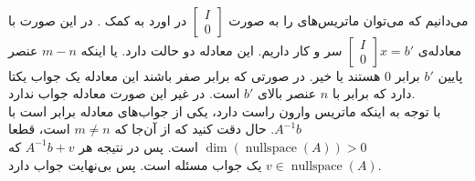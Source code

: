 \\
می‌دانیم که می‌توان ماتریس‌های
را به صورت
$\begin{bmatrix}
    I \\ 0
\end{bmatrix}$
در اورد به کمک
.
در این صورت با معادله‌ی
$\begin{bmatrix}
    I \\ 0
\end{bmatrix} x = b'$
سر و کار داریم.
این معادله دو حالت دارد. یا اینکه
$m-n$
عنصر پایین
$b'$
برابر 0 هستند یا خیر. در صورتی که برابر صفر باشند این معادله یک جواب یکتا دارد که برابر با
$n$
عنصر بالای
$b'$
است.
در غیر این صورت معادله جواب ندارد.
\\
با توجه به اینکه ماتریس وارون راست دارد، یکی از جواب‌های معادله برابر است با
$A^{-1}b$.
حال دقت کنید که از آن‌جا که
$m \neq n$
است، قطعا
$\operatorname{dim}(\operatorname{nullspace}(A)) > 0$
است. پس در نتیجه هر
$A^{-1}b + v$
که
$v \in \operatorname{nullspace}(A)$
یک جواب مسئله است. پس بی‌نهایت جواب دارد.


